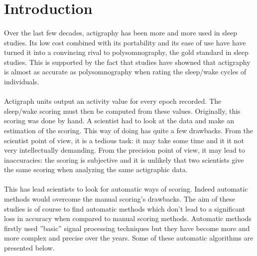 \documentclass[a4paper,12pt]{article}
\begin{document}
 \newpage
 
 \tableofcontents
 \newpage


\section*{Introduction}

\paragraph{}
Over the last few decades, actigraphy has been more and more used in sleep studies. Its low cost combined with its portability and its ease of use have have turned it into a convincing rival to polysomnography, the gold standard in sleep studies. This is supported by the fact that studies have showned that actigraphy is almost as accurate as polysomnography when rating the sleep/wake cycles of individuals.

\paragraph{}
Actigraph units output an activity value for every epoch recorded. The sleep/wake scoring must then be computed from these values. Originally, this scoring was done by hand. A scientist had to look at the data and make an estimation of the scoring. This way of doing has quite a few drawbacks. From the scientist point of view, it is a tedious task: it may take some time and it it not very intellectually demanding. From the precision point of view, it may lead to inaccuracies: the scoring is subjective and it is unlikely that two scientists give the same scoring when analyzing the same actigraphic data.

\paragraph{}
This has lead scientists to look for automatic ways of scoring. Indeed automatic methods would overcome the manual scoring's drawbacks. The aim of these studies is of course to find automatic methods which don't lead to a significant loss in accuracy when compared to manual scoring methods. Automatic methods firstly used ''basic'' signal processing techniques but they have become more and more complex and precise over the years. Some of these automatic algorithms are presented below.
\end{document}
